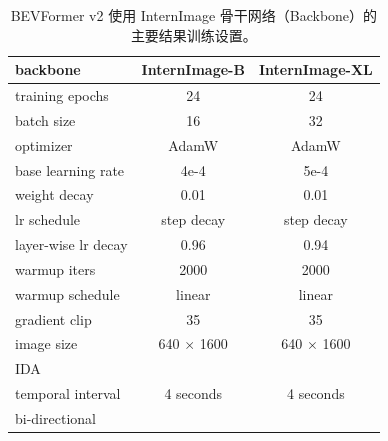 \let\ck\checkmark

\setlength{\tabcolsep}{5pt}
\setlength{\doublerulesep}{2\arrayrulewidth}
\renewcommand{\arraystretch}{1.0}
\begin{table}[ht]
    \caption{BEVFormer v2 使用 InternImage 骨干网络（Backbone）的主要结果训练设置。}
    \label{table:training_setting_main}
    \centering
    \begin{tabular}{l|cc}
        backbone & InternImage-B & InternImage-XL \\
        \hline
        training epochs & 24 & 24 \\
        batch size & 16 & 32 \\
        optimizer & AdamW & AdamW \\
        base learning rate & 4e-4 & 5e-4 \\
        weight decay & 0.01 & 0.01 \\
        lr schedule & step decay & step decay\\
        layer-wise lr decay & 0.96 & 0.94 \\
        warmup iters & 2000 & 2000  \\
        warmup schedule & linear & linear \\
        gradient clip & 35 & 35 \\
        \hline
        image size & 640 $\times$ 1600 & 640 $\times$ 1600 \\
        IDA & \ck & \ck \\
        temporal interval & 4 seconds & 4 seconds \\
        bi-directional & \ck & \ck \\
        \hline
    \end{tabular}
    
\end{table}